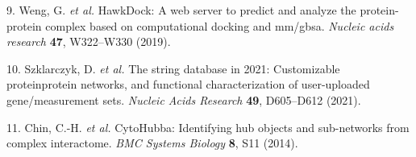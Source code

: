 \documentclass[
]{article}
\newenvironment{cslreferences}%
  {}%
  {\par}
\begin{document}
\begin{cslreferences}
\leavevmode\hypertarget{ref-HawkdockAWebWeng2019}{}%
9. Weng, G. \emph{et al.} HawkDock: A web server to predict and analyze the protein-protein complex based on computational docking and mm/gbsa. \emph{Nucleic acids research} \textbf{47}, W322--W330 (2019).

\leavevmode\hypertarget{ref-TheStringDataSzklar2021}{}%
10. Szklarczyk, D. \emph{et al.} The string database in 2021: Customizable proteinprotein networks, and functional characterization of user-uploaded gene/measurement sets. \emph{Nucleic Acids Research} \textbf{49}, D605--D612 (2021).

\leavevmode\hypertarget{ref-CytohubbaIdenChin2014}{}%
11. Chin, C.-H. \emph{et al.} CytoHubba: Identifying hub objects and sub-networks from complex interactome. \emph{BMC Systems Biology} \textbf{8}, S11 (2014).
\end{cslreferences}
\end{document}
